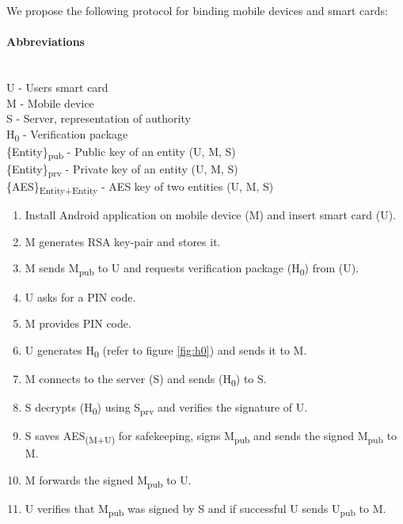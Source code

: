 We propose the following protocol for binding mobile devices and smart cards:

\paragraph{Abbreviations}\mbox{}\\
U - Users smart card \\
M - Mobile device \\
S - Server, representation of authority \\
H\textsubscript{0} - Verification package \\
\{Entity\}\textsubscript{pub} - Public key of an entity (U, M, S)\\
\{Entity\}\textsubscript{prv} - Private key of an entity (U, M, S)\\
\{AES\}\textsubscript{Entity+Entity} - AES key of two entities (U, M, S)\\


\begin{enumerate}
  \item Install Android application on mobile device (M) and insert smart card (U).
  \item M generates RSA key-pair and stores it.
  \item M sends M\textsubscript{pub} to U and requests verification package (H\textsubscript{0}) from (U).
  \item U asks for a PIN code.
  \item M provides PIN code.
  \item U generates H\textsubscript{0} (refer to figure \ref{fig:h0}) and sends it to M.
  \item M connects to the server (S) and sends (H\textsubscript{0}) to S.
  \item S decrypts (H\textsubscript{0}) using S\textsubscript{prv} and verifies the signature of U.
  \item S saves AES\textsubscript{(M+U)} for safekeeping, signs M\textsubscript{pub} and sends the signed  M\textsubscript{pub} to M.
  \item M forwards the signed M\textsubscript{pub} to U.
  \item U verifies that M\textsubscript{pub} was signed by S and if successful U sends U\textsubscript{pub} to M.
\end{enumerate}

